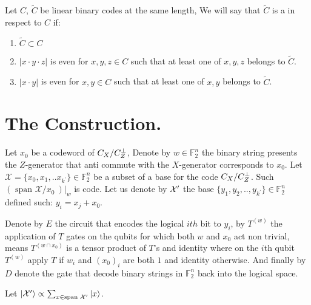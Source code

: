 \documentclass[manuscript,screen,review]{acmart}
\begin{document}
\begin{definition}
  Let $C$, $\tilde{C}$ be linear binary codes at the same length, We will say that $\tilde{C}$ is a \trig in respect to $C$ if: 
  \begin{enumerate}
    \item $\tilde{C} \subset C$
    \item $|x\cdot y \cdot z|$ is even for $x,y,z \in C$ such that at least one of $x,y,z$  belongs to $\tilde{C}$. 
    \item $|x\cdot y|$ is even for $x,y \in C$ such that at least one of $x,y$  belongs to $\tilde{C}$. 
  \end{enumerate}
\end{definition}

\section{The Construction.}

Let $x_{0}$ be a codeword of $C_{X}/C_{Z}^\perp$,  Denote by $w \in \mathbb{F}_{2}^{n}$
the binary string presents the $Z$-generator that anti commute with the
$X$-generator corresponds to $x_{0}$. Let $\mathcal{X} = \{x_{0}, x_{1}, .. x_{k^\prime}\} \in \mathbb{F}_{2}^{n}$ be a
subset of a base for the code $C_{X}/C_{Z}^\perp$. Such $\left(\text{ span } \mathcal{X}/x_0 \ \right)|_{w}$ is \trig code.  
Let us denote by $\mathcal{X}^\prime$ the base $\{ y_{1}, y_{2}, .., y_{k^\prime} \} \in
\mathbb{F}_{2}^{n}$ defined such: $ y_{i} = x_{j} + x_{0}$. 

Denote by $E$ the circuit that encodes the logical $ith$ bit to $y_{i}$, by $T^{(w)}$ the application of
$T$ gates on the qubits for which both $w$ and $x_{0}$ act non trivial, means $T^{(w\cap x_0)}$ is a
tensor product of $T$'s and identity where on the $i$th qubit $T^{(w)}$ apply
$T$ if $w_{i}$ and $(x_{0})_{i}$ are both $1$ and identity otherwise. And finally by $D$ denote the gate that decode binary strings in $\mathbb{F}_{2}^{n}$ back into the logical space.

Let $\ket{\mathcal{X}^\prime} \propto \sum_{x \in \text{span } \mathcal{X}^\prime }{\ket{x}}$.
\end{document}
